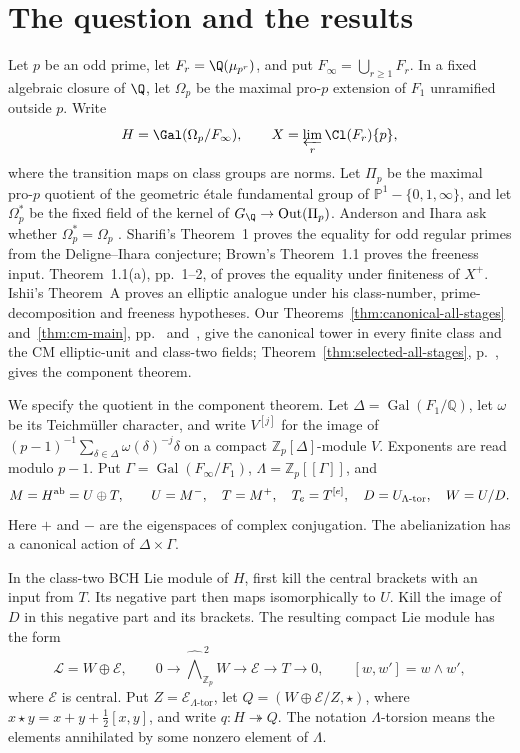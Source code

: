 \documentclass[11pt]{article}
\theoremstyle{definition}\newtheorem{definition}[theorem]{Definition}
\begin{document}
\section{The question and the results}
Let $p$ be an odd prime, let $F_r=\Q(\mu_{p^r})$, and put $F_\infty=\bigcup_{r\ge1}F_r$. In a fixed algebraic closure of $\Q$, let $\Omega_p$ be the maximal pro-$p$ extension of $F_1$ unramified outside $p$. Write
\[
 H=\Gal(\Omega_p/F_\infty),\qquad
 X=\varprojlim_r\Cl(F_r)\{p\},
\]
where the transition maps on class groups are norms. Let $\Pi_p$ be the maximal pro-$p$ quotient of the geometric \'etale fundamental group of $\mathbb P^1-\{0,1,\infty\}$, and let $\Omega_p^*$ be the fixed field of the kernel of $G_\Q\to\operatorname{Out}(\Pi_p)$.
Anderson and Ihara ask whether $\Omega_p^*=\Omega_p$ \cite[p.~272, question (a)]{AI}. Sharifi's Theorem~1 \cite[p.~2]{Sharifi} proves the equality for odd regular primes from the Deligne--Ihara conjecture; Brown's Theorem~1.1 \cite[p.~949]{Brown} proves the freeness input. Theorem~1.1(a), pp.~1--2, of \cite{Note} proves the equality under finiteness of $X^+$.
Ishii's Theorem~A \cite[p.~2; Theorem~2.14, p.~11]{Ishii} proves an elliptic analogue under his class-number, prime-decomposition and freeness hypotheses. Our Theorems~\ref{thm:canonical-all-stages} and~\ref{thm:cm-main}, pp.~\pageref{thm:canonical-all-stages} and~\pageref{thm:cm-main}, give the canonical tower in every finite class and the CM elliptic-unit and class-two fields; Theorem~\ref{thm:selected-all-stages}, p.~\pageref{thm:selected-all-stages}, gives the component theorem.

We specify the quotient in the component theorem. Let
$\Delta=\operatorname{Gal}(F_1/\mathbb Q)$, let $\omega$ be its
Teichm\"uller character, and write $V^{[j]}$ for the image of
$(p-1)^{-1}\sum_{\delta\in\Delta}\omega(\delta)^{-j}\delta$
on a compact $\mathbb Z_p[\Delta]$-module $V$. Exponents are
read modulo $p-1$. Put $\Gamma=\operatorname{Gal}(F_\infty/F_1)$,
$\Lambda=\mathbb Z_p[[\Gamma]]$, and
\[
 M=H^{\rm ab}=U\oplus T,\qquad U=M^-,\quad T=M^+,
 \quad T_e=T^{[e]},\quad D=U_{\Lambda\text{-tor}},\quad W=U/D.
\]
Here $+$ and $-$ are the eigenspaces of complex conjugation.
The abelianization has a canonical action of $\Delta\times\Gamma$.

In the class-two BCH Lie module of $H$, first kill the central
brackets with an input from $T$. Its negative part then maps
isomorphically to $U$. Kill the image of $D$ in this negative
part and its brackets. The resulting compact Lie module has the
form
\[
 \mathcal L=W\oplus\mathcal E,\qquad
 0\longrightarrow\widehat{\bigwedge}^{\,2}_{\mathbb Z_p}W
 \longrightarrow\mathcal E\longrightarrow T\longrightarrow0,
 \qquad [w,w']=w\wedge w',
\]
where $\mathcal E$ is central. Put $Z=\mathcal E_{\Lambda\text{-tor}}$, let
$Q=(W\oplus\mathcal E/Z,\star)$, where
$x\star y=x+y+\tfrac12[x,y]$, and write $q:H\twoheadrightarrow Q$.
The notation $\Lambda$-torsion means the elements annihilated
by some nonzero element of $\Lambda$.
\end{document}
